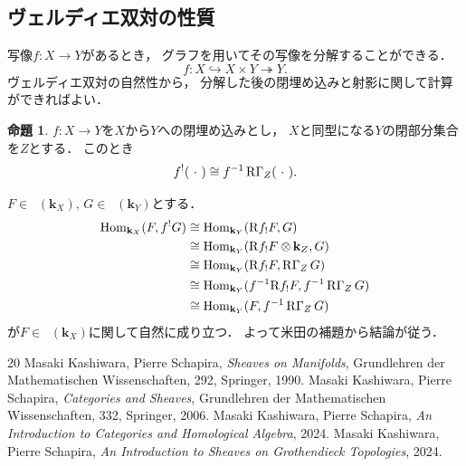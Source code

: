 \documentclass[uplatex,dvipdfmx,a4paper,10pt,draft]{jsarticle}
\makeatletter
\theoremstyle{definition}
\newcommand{\kk}{\mathbf{k}}
\newcommand{\Hom}{\mathop{\mathrm{Hom}}\nolimits} %
\renewenvironment{proof}[1][\proofname]{\par
  \pushQED{\qed}%
  \normalfont \topsep6\p@\@plus6\p@\relax
  \trivlist
  \item[\hskip\labelsep
         \bfseries
    {#1}]\ignorespaces
}{%
  \popQED\endtrivlist\@endpefalse
}
\renewcommand{\proofname}{証明.}
\numberwithin{equation}{section}
\newcommand{\Dompl}{\mathop{\mathsf{D}^\mathrm{+}}\nolimits}
\newcommand{\Dompb}{\mathop{\mathsf{D}^\mathrm{b}}\nolimits}
\newcommand{\RG}{\mathop{\mathrm{R}\hspace{-0pt}\Gamma}\nolimits}
\newcommand{\Rdf}{\mathrm{R}}
\newcommand{\tens}[1][]{\mathbin{\otimes_{\raise1.5ex\hbox to-.1em{}{#1}}}}
\newcommand{\blk}{\mathord{\ \cdot\ }}
\theoremstyle{mystyle}
\newtheorem{PRP}[AXM]{命題}
\makeatother
\begin{document}
\subsection{ヴェルディエ双対の性質}

写像\(f\colon X\to Y\)があるとき，
グラフを用いてその写像を分解することができる．
\[
    f\colon X\hookrightarrow X\times Y\twoheadrightarrow Y.
\]
ヴェルディエ双対の自然性から，
分解した後の閉埋め込みと射影に関して計算ができればよい．

\begin{PRP}
    \(f\colon X\to Y\)を\(X\)から\(Y\)への閉埋め込みとし，
    \(X\)と同型になる\(Y\)の閉部分集合を\(Z\)とする．
    このとき\[
        f^{!}(\blk)\cong f^{-1}\RG_{Z}(\blk).
    \]
\end{PRP}

\begin{proof}
    \(F\in\Dompb(\kk_X)\), \(G\in\Dompl(\kk_Y)\)とする．
    \begin{align*}
        \Hom_{\kk_X}(F,f^{!}G)
        &\cong \Hom_{\kk_Y}(\Rdf{f_!}F,G)\\
        &\cong \Hom_{\kk_Y}(\Rdf{f_!}F\tens[]\kk_{Z},G)\\
        &\cong \Hom_{\kk_Y}(\Rdf{f_!}F,\RG_{Z}G)\\
        &\cong \Hom_{\kk_Y}(f^{-1}\Rdf{f_!}F,f^{-1}\RG_{Z}G)\\
        &\cong \Hom_{\kk_Y}(F,f^{-1}\RG_{Z}G)
    \end{align*}
    が\(F\in\Dompb(\kk_X)\)に関して自然に成り立つ．
    よって米田の補題から結論が従う．
\end{proof}



\begin{thebibliography}{20} 
     Masaki Kashiwara, Pierre Schapira, 
      \textit{Sheaves on Manifolds}, 
      Grundlehren der Mathematischen Wissenschaften, 292, Springer, 1990.
     Masaki Kashiwara, Pierre Schapira, 
      \textit{Categories and Sheaves}, 
      Grundlehren der Mathematischen Wissenschaften, 332, Springer, 2006.
     Masaki Kashiwara, Pierre Schapira, 
      \textit{An Introduction to Categories and Homological Algebra}, 
      2024.
     Masaki Kashiwara, Pierre Schapira, 
      \textit{An Introduction to Sheaves on Grothendieck Topologies}, 
      2024.
\end{thebibliography}
  
\end{document}
